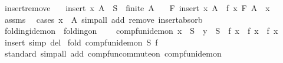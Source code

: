 \begin{isabellebody}
\isanewline
{}\isamarkupfalse%
\ insert{\isacharunderscore}{\kern0pt}remove{\isacharcolon}{\kern0pt}\isanewline
\ \ \ {\isachardoublequoteopen}insert\ x\ A\ {\isasymsubseteq}\ S{\isachardoublequoteclose}\ \ {\isachardoublequoteopen}finite\ A{\isachardoublequoteclose}\isanewline
\ \ \ {\isachardoublequoteopen}F\ {\isacharparenleft}{\kern0pt}insert\ x\ A{\isacharparenright}{\kern0pt}\ {\isacharequal}{\kern0pt}\ f\ x\ {\isacharparenleft}{\kern0pt}F\ {\isacharparenleft}{\kern0pt}A\ {\isacharminus}{\kern0pt}\ {\isacharbraceleft}{\kern0pt}x{\isacharbraceright}{\kern0pt}{\isacharparenright}{\kern0pt}{\isacharparenright}{\kern0pt}{\isachardoublequoteclose}\isanewline
%
\isadelimproof
\ \ %
\endisadelimproof
%
\isatagproof
{}\isamarkupfalse%
\ assms\ \isamarkupfalse%
\ {\isacharparenleft}{\kern0pt}cases\ {\isachardoublequoteopen}x\ {\isasymin}\ A{\isachardoublequoteclose}{\isacharparenright}{\kern0pt}\ {\isacharparenleft}{\kern0pt}simp{\isacharunderscore}{\kern0pt}all\ add{\isacharcolon}{\kern0pt}\ remove\ insert{\isacharunderscore}{\kern0pt}absorb{\isacharparenright}{\kern0pt}%
\endisatagproof
{\isafoldproof}%
%
\isadelimproof
\isanewline
%
\endisadelimproof
\isanewline
{}\isamarkupfalse%
%
\isadelimdocument
%
\endisadelimdocument
%
\isatagdocument
%
\isamarkuptrue%
%
\endisatagdocument
{\isafolddocument}%
%
\isadelimdocument
%
\endisadelimdocument
{}\isamarkupfalse%
\ folding{\isacharunderscore}{\kern0pt}idem{\isacharunderscore}{\kern0pt}on\ {\isacharequal}{\kern0pt}\ folding{\isacharunderscore}{\kern0pt}on\ {\isacharplus}{\kern0pt}\isanewline
\ \ \ comp{\isacharunderscore}{\kern0pt}fun{\isacharunderscore}{\kern0pt}idem{\isacharunderscore}{\kern0pt}on{\isacharcolon}{\kern0pt}\ {\isachardoublequoteopen}x\ {\isasymin}\ S\ {\isasymLongrightarrow}\ y\ {\isasymin}\ S\ {\isasymLongrightarrow}\ f\ x\ {\isasymcirc}\ f\ x\ {\isacharequal}{\kern0pt}\ f\ x{\isachardoublequoteclose}\isanewline
{}\isanewline
\isanewline
{}\isamarkupfalse%
\ insert\ {\isacharbrackleft}{\kern0pt}simp\ del{\isacharbrackright}{\kern0pt}\isanewline
\isanewline
{}\isamarkupfalse%
\ fold{\isacharquery}{\kern0pt}{\isacharcolon}{\kern0pt}\ comp{\isacharunderscore}{\kern0pt}fun{\isacharunderscore}{\kern0pt}idem{\isacharunderscore}{\kern0pt}on\ S\ f\isanewline
%
\isadelimproof
\ \ %
\endisadelimproof
%
\isatagproof
{}\isamarkupfalse%
\ standard\ {\isacharparenleft}{\kern0pt}simp{\isacharunderscore}{\kern0pt}all\ add{\isacharcolon}{\kern0pt}\ comp{\isacharunderscore}{\kern0pt}fun{\isacharunderscore}{\kern0pt}commute{\isacharunderscore}{\kern0pt}on\ comp{\isacharunderscore}{\kern0pt}fun{\isacharunderscore}{\kern0pt}idem{\isacharunderscore}{\kern0pt}on{\isacharparenright}{\kern0pt}%

\end{isabellebody}
